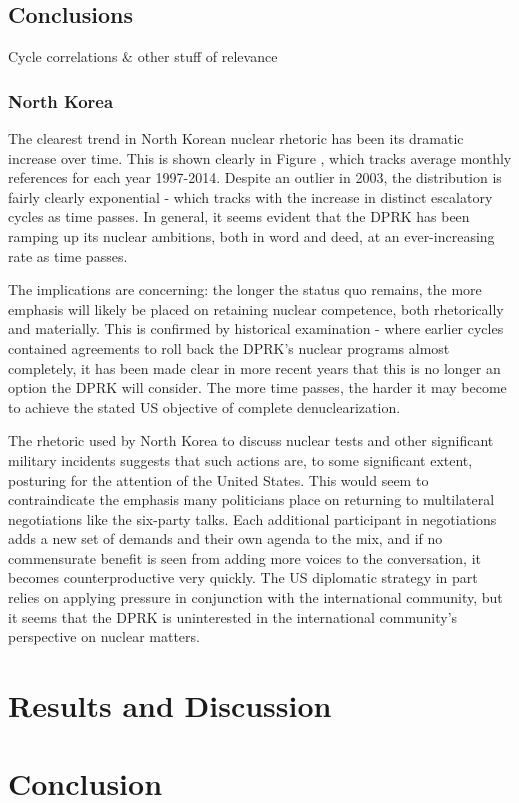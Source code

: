 \documentclass{article}
\begin{document}
\subsection{Conclusions}
Cycle correlations \& other stuff of relevance

\subsubsection{North Korea}

The clearest trend in North Korean nuclear rhetoric has been its dramatic increase over time. This is shown clearly in Figure , which tracks average monthly references for each year 1997-2014. Despite an outlier in 2003, the distribution is fairly clearly exponential - which tracks with the increase in distinct escalatory cycles as time passes. In general, it seems evident that the DPRK has been ramping up its nuclear ambitions, both in word and deed, at an ever-increasing rate as time passes.

The implications are concerning: the longer the status quo remains, the more emphasis will likely be placed on retaining nuclear competence, both rhetorically and materially. This is confirmed by historical examination - where earlier cycles contained agreements to roll back the DPRK's nuclear programs almost completely, it has been made clear in more recent years that this is no longer an option the DPRK will consider. The more time passes, the harder it may become to achieve the stated US objective of complete denuclearization.

The rhetoric used by North Korea to discuss nuclear tests and other significant military incidents suggests that such actions are, to some significant extent, posturing for the attention of the United States. This would seem to contraindicate the emphasis many politicians place on returning to multilateral negotiations like the six-party talks. Each additional participant in negotiations adds a new set of demands and their own agenda to the mix, and if no commensurate benefit is seen from adding more voices to the conversation, it becomes counterproductive very quickly. The US diplomatic strategy in part relies on applying pressure in conjunction with the international community, but it seems that the DPRK is uninterested in the international community's perspective on nuclear matters.

\section{Results and Discussion}

\section{Conclusion}




\todos
\end{document}
